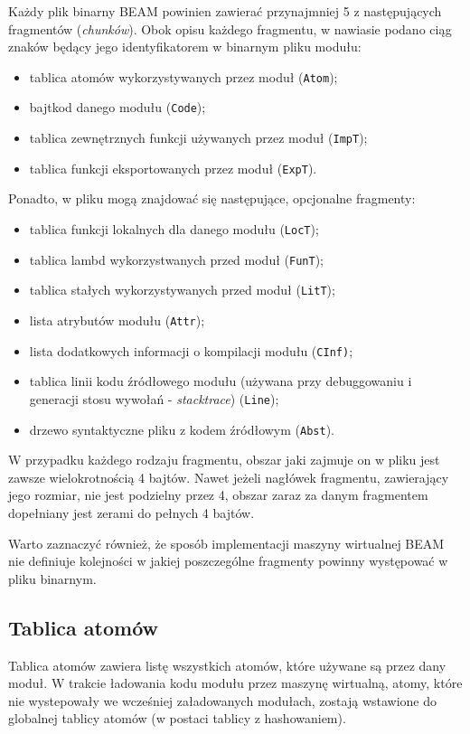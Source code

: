 Każdy plik binarny BEAM powinien zawierać przynajmniej 5 z następujących fragmentów (\emph{chunków}).
Obok opisu każdego fragmentu, w nawiasie podano ciąg znaków będący jego identyfikatorem w binarnym pliku modułu:
\begin{itemize}
\item tablica atomów wykorzystywanych przez moduł (\texttt{Atom});
\item bajtkod danego modułu (\texttt{Code});
\item tablica zewnętrznych funkcji używanych przez moduł (\texttt{ImpT});
\item tablica funkcji eksportowanych przez moduł (\texttt{ExpT}).
\end{itemize}

Ponadto, w pliku mogą znajdować się następujące, opcjonalne fragmenty:
\begin{itemize}
\item tablica funkcji lokalnych dla danego modułu (\texttt{LocT});
\item tablica lambd wykorzystwanych przed moduł (\texttt{FunT});
\item tablica stałych wykorzystywanych przed moduł (\texttt{LitT});
\item lista atrybutów modułu (\texttt{Attr});
\item lista dodatkowych informacji o kompilacji modułu (\texttt{CInf)};
\item tablica linii kodu źródłowego modułu (używana przy debuggowaniu i generacji stosu wywołań - \emph{stacktrace}) (\texttt{Line});
\item drzewo syntaktyczne pliku z kodem źródłowym (\texttt{Abst}).
\end{itemize}

W przypadku każdego rodzaju fragmentu, obszar jaki zajmuje on w pliku jest zawsze wielokrotnością 4 bajtów. Nawet jeżeli nagłówek fragmentu, zawierający jego rozmiar, nie jest podzielny przez 4, obszar zaraz za danym fragmentem dopełniany jest zerami do pełnych 4 bajtów.

Warto zaznaczyć również, że sposób implementacji maszyny wirtualnej BEAM nie definiuje kolejności w jakiej poszczególne fragmenty powinny występować w pliku binarnym.

\subsection{Tablica atomów}
Tablica atomów zawiera listę wszystkich atomów, które używane są przez dany moduł. W trakcie ładowania kodu modułu przez maszynę wirtualną, atomy, które nie wystepowały we wcześniej załadowanych modułach, zostają wstawione do globalnej tablicy atomów (w postaci tablicy z hashowaniem).

